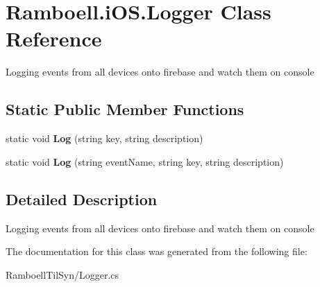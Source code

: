 \hypertarget{class_ramboell_1_1i_o_s_1_1_logger}{}\section{Ramboell.\+i\+O\+S.\+Logger Class Reference}
\label{class_ramboell_1_1i_o_s_1_1_logger}


Logging events from all devices onto firebase and watch them on console  


\subsection*{Static Public Member Functions}
\begin{DoxyCompactItemize}
\item 
\mbox{\label{class_ramboell_1_1i_o_s_1_1_logger_a8e50b94799794db86f2b88ffbfa060cf}} 
static void {\bfseries Log} (string key, string description)
\item 
\mbox{\label{class_ramboell_1_1i_o_s_1_1_logger_a1c07216d9ee25c80a79be09c9387b48b}} 
static void {\bfseries Log} (string event\+Name, string key, string description)
\end{DoxyCompactItemize}


\subsection{Detailed Description}
Logging events from all devices onto firebase and watch them on console 



The documentation for this class was generated from the following file\+:\begin{DoxyCompactItemize}
\item 
Ramboell\+Til\+Syn/Logger.\+cs\end{DoxyCompactItemize}
